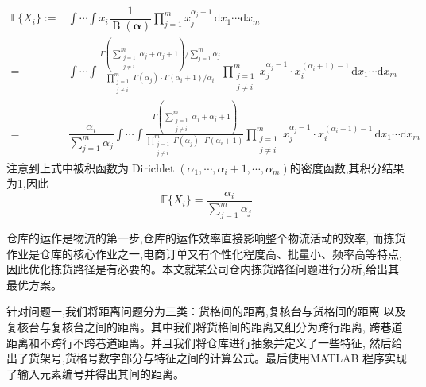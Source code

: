 \documentclass[12pt]{thesis-NJFU}
\begin{document}
\begin{align*}
	\mathbb{E}\{X_i\} :=& \int\cdots\int x_i \dfrac1{\operatorname{B}(\boldsymbol{\alpha})} \prod\limits_{j=1}^m x_j^{\alpha_j - 1} \, \mathrm{d}x_1 \cdots \mathrm{d}x_m\\
	=& \int\cdots\int \frac{\Gamma\left(\sum\limits_{\substack{j=1 \\ j\neq i}}^m \alpha_j + \alpha_j + 1\right)/{\sum\limits_{j=1}^m \alpha_j}}{\prod\limits_{\substack{j=1 \\ j\neq i}}^m \Gamma(\alpha_j) \cdot \Gamma(\alpha_i + 1) / \alpha_i}\prod\limits_{\substack{j=1 \\ j\neq i}}^m x_j^{\alpha_j - 1} \cdot x_i^{(\alpha_i+1) - 1} \, \mathrm{d}x_1 \cdots \mathrm{d}x_m\\
	=& \dfrac{\alpha_i}{\sum\limits_{j=1}^m \alpha_j} \int\cdots\int \frac{\Gamma\left(\sum\limits_{\substack{j=1 \\ j\neq i}}^m \alpha_j + \alpha_j + 1\right)}{\prod\limits_{\substack{j=1 \\ j\neq i}}^m \Gamma(\alpha_j) \cdot \Gamma(\alpha_i + 1)}\prod\limits_{\substack{j=1 \\ j\neq i}}^m x_j^{\alpha_j - 1} \cdot x_i^{(\alpha_i+1) - 1} \, \mathrm{d}x_1 \cdots \mathrm{d}x_m
\end{align*}
注意到上式中被积函数为$\operatorname{Dirichlet}(\alpha_1,\cdots,\alpha_i+1,\cdots,\alpha_m)$的密度函数,其积分结果为1,因此
\[
	\mathbb{E}\{X_i\} = \dfrac{\alpha_i}{\sum\limits_{j=1}^m \alpha_j}
\]

仓库的运作是物流的第一步,仓库的运作效率直接影响整个物流活动的效率,
而拣货作业是仓库的核心作业之一,电商订单又有个性化程度高、批量小、频率高等特点,
因此优化拣货路径是有必要的。本文就某公司仓内拣货路径问题进行分析,给出其最优方案。

针对问题一,我们将距离问题分为三类：货格间的距离,复核台与货格间的距离
以及复核台与复核台之间的距离。其中我们将货格间的距离又细分为跨行距离,
跨巷道距离和不跨行不跨巷道距离。并且我们将仓库进行抽象并定义了一些特征,
然后给出了货架号,货格号数字部分与特征之间的计算公式。最后使用MATLAB
程序实现了输入元素编号并得出其间的距离。
\end{document}
